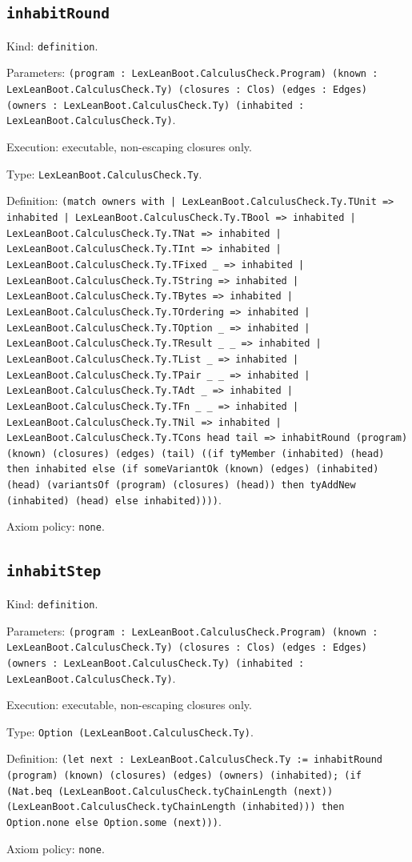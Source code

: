 \documentclass[11pt]{article}
\begin{document}
\subsection*{\texttt{inhabitRound}}
\noindent Kind: \texttt{definition}.\par
\noindent Parameters: \texttt{(program : LexLeanBoot.CalculusCheck.Program) (known : LexLeanBoot.CalculusCheck.Ty) (closures : Clos) (edges : Edges) (owners : LexLeanBoot.CalculusCheck.Ty) (inhabited : LexLeanBoot.CalculusCheck.Ty)}.\par
\noindent Execution: executable, non-escaping closures only.\par
\noindent Type: \texttt{LexLeanBoot.CalculusCheck.Ty}.\par
\noindent Definition: \texttt{(match owners with | LexLeanBoot.CalculusCheck.Ty.TUnit => inhabited | LexLeanBoot.CalculusCheck.Ty.TBool => inhabited | LexLeanBoot.CalculusCheck.Ty.TNat => inhabited | LexLeanBoot.CalculusCheck.Ty.TInt => inhabited | LexLeanBoot.CalculusCheck.Ty.TFixed \_ => inhabited | LexLeanBoot.CalculusCheck.Ty.TString => inhabited | LexLeanBoot.CalculusCheck.Ty.TBytes => inhabited | LexLeanBoot.CalculusCheck.Ty.TOrdering => inhabited | LexLeanBoot.CalculusCheck.Ty.TOption \_ => inhabited | LexLeanBoot.CalculusCheck.Ty.TResult \_ \_ => inhabited | LexLeanBoot.CalculusCheck.Ty.TList \_ => inhabited | LexLeanBoot.CalculusCheck.Ty.TPair \_ \_ => inhabited | LexLeanBoot.CalculusCheck.Ty.TAdt \_ => inhabited | LexLeanBoot.CalculusCheck.Ty.TFn \_ \_ => inhabited | LexLeanBoot.CalculusCheck.Ty.TNil => inhabited | LexLeanBoot.CalculusCheck.Ty.TCons head tail => inhabitRound (program) (known) (closures) (edges) (tail) ((if tyMember (inhabited) (head) then inhabited else (if someVariantOk (known) (edges) (inhabited) (head) (variantsOf (program) (closures) (head)) then tyAddNew (inhabited) (head) else inhabited))))}.\par
\noindent Axiom policy: \texttt{none}.\par
\subsection*{\texttt{inhabitStep}}
\noindent Kind: \texttt{definition}.\par
\noindent Parameters: \texttt{(program : LexLeanBoot.CalculusCheck.Program) (known : LexLeanBoot.CalculusCheck.Ty) (closures : Clos) (edges : Edges) (owners : LexLeanBoot.CalculusCheck.Ty) (inhabited : LexLeanBoot.CalculusCheck.Ty)}.\par
\noindent Execution: executable, non-escaping closures only.\par
\noindent Type: \texttt{Option (LexLeanBoot.CalculusCheck.Ty)}.\par
\noindent Definition: \texttt{(let next : LexLeanBoot.CalculusCheck.Ty := inhabitRound (program) (known) (closures) (edges) (owners) (inhabited); (if (Nat.beq (LexLeanBoot.CalculusCheck.tyChainLength (next)) (LexLeanBoot.CalculusCheck.tyChainLength (inhabited))) then Option.none else Option.some (next)))}.\par
\noindent Axiom policy: \texttt{none}.\par
\end{document}
